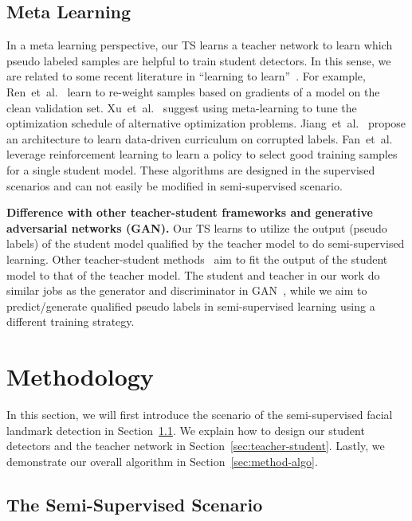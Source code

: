 \documentclass[10pt,twocolumn,letterpaper]{article}
\def\Secref#1{Section~\ref{#1}}
\def\NAME{{{TS}}} \def\LLB{\textcolor{red}}
\begin{document}
\subsection{Meta Learning}\label{sec:relate-meta}

In a meta learning perspective, our TS learns a teacher network to learn which pseudo labeled samples are helpful to train student detectors.
In this sense, we are related to some recent literature in ``learning to learn''~\cite{liu2019ppn,ren2018learning,fan2018learning,xu2019autoloss}.
For example, Ren~et~al.~\cite{ren2018learning} learn to re-weight samples based on gradients of a model on the clean validation set.
Xu~et~al.~\cite{xu2019autoloss} suggest using meta-learning to tune the optimization schedule of alternative optimization problems.
Jiang~et~al.~\cite{jiang2018mentornet} propose an architecture to learn data-driven curriculum on corrupted labels.
Fan~et~al.~\cite{fan2018learning} leverage reinforcement learning to learn a policy to select good training samples for a single student model.
These algorithms are designed in the supervised scenarios and can not easily be modified in semi-supervised scenario.


\textbf{Difference with other teacher-student frameworks and generative adversarial networks (GAN).}
Our {\NAME} learns to utilize the output (pseudo labels) of the student model qualified by the teacher model to do semi-supervised learning.
Other teacher-student methods~\cite{tarvainen2017mean,hinton2014distilling,dong2019tas,lee2018teacher} aim to fit the output of the student model to that of the teacher model.
The student and teacher in our work do similar jobs as the generator and discriminator in GAN~\cite{goodfellow2014generative}, while we aim to predict/generate qualified pseudo labels in semi-supervised learning using a different training strategy. 



\section{Methodology}\label{sec:method}

In this section, we will first introduce the scenario of the semi-supervised facial landmark detection in \Secref{sec:method-setting}. We explain how to design our student detectors and the teacher network in \Secref{sec:teacher-student}. Lastly, we demonstrate our overall algorithm in \Secref{sec:method-algo}.


\subsection{The Semi-Supervised Scenario}\label{sec:method-setting}
\end{document}
